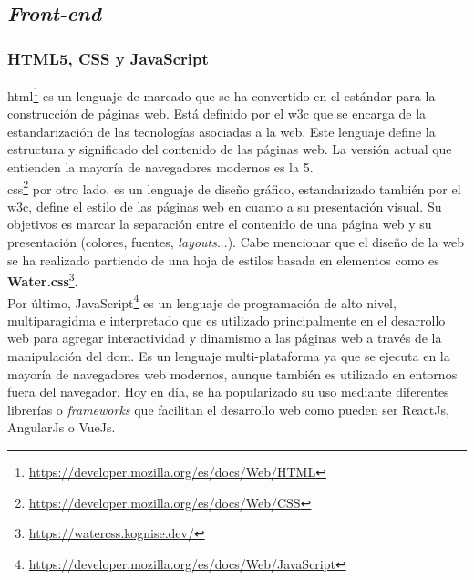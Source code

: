 \subsection{\textit{Front-end}}
\subsubsection{HTML5, CSS y JavaScript}
\acrfull{html}\footnote{\url{https://developer.mozilla.org/es/docs/Web/HTML}} es un lenguaje de marcado que se ha convertido en el estándar para la construcción de páginas web. Está definido por el \acrfull{w3c} que se encarga de la estandarización de las tecnologías asociadas a la web. Este lenguaje define la estructura y significado del contenido de las páginas web. La versión actual que entienden la mayoría de navegadores modernos es la 5.\\
\acrfull{css}\footnote{\url{https://developer.mozilla.org/es/docs/Web/CSS}} por otro lado, es un lenguaje de diseño gráfico, estandarizado también por el \acrshort{w3c}, define el estilo de las páginas web en cuanto a su presentación visual. Su objetivos es marcar la separación entre el contenido de una página web y su presentación (colores, fuentes, \textit{layouts}...).
Cabe mencionar que el diseño de la web se ha realizado partiendo de una hoja de estilos basada en elementos como es \textbf{Water.css}\footnote{\url{https://watercss.kognise.dev/}}.\\
Por último, JavaScript\footnote{\url{https://developer.mozilla.org/es/docs/Web/JavaScript}} es un lenguaje de programación de alto nivel, multiparagidma e interpretado que es utilizado principalmente en el desarrollo web para agregar interactividad y dinamismo a las páginas web a través de la manipulación del \acrfull{dom}. Es un lenguaje multi-plataforma ya que se ejecuta en la mayoría de navegadores web modernos, aunque también es utilizado en entornos fuera del navegador. Hoy en día, se ha popularizado su uso mediante diferentes librerías o \textit{frameworks} que facilitan el desarrollo web como pueden ser ReactJs, AngularJs o VueJs.
